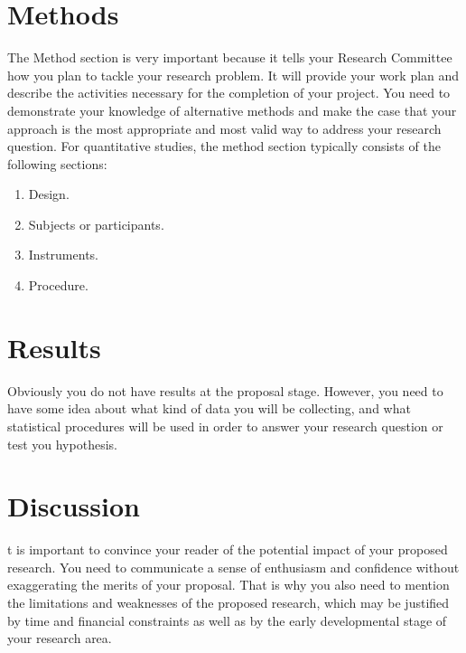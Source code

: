 \documentclass[a4paper, 12pt]{article}
\begin{document}
\section{Methods}
The Method section is very important because it tells your Research Committee how
you plan to tackle your research problem. It will provide your work plan and describe
the activities necessary for the completion of your project.
You need to demonstrate your knowledge of alternative methods and make the case
that your approach is the most appropriate and most valid way to address your
research question. \newline
For quantitative studies, the method section typically consists of the following
sections:
\begin{enumerate}
	\item Design.
	\item Subjects or participants.
	\item Instruments.
	\item Procedure.

\end{enumerate}

\section{Results}
Obviously you do not have results at the proposal stage. However, you need to have
some idea about what kind of data you will be collecting, and what statistical
procedures will be used in order to answer your research question or test you
hypothesis.
\section{Discussion}
t is important to convince your reader of the potential impact of your proposed
research. You need to communicate a sense of enthusiasm and confidence without
exaggerating the merits of your proposal. That is why you also need to mention the
limitations and weaknesses of the proposed research, which may be justified by time
and financial constraints as well as by the early developmental stage of your
research area.
\end{document}
